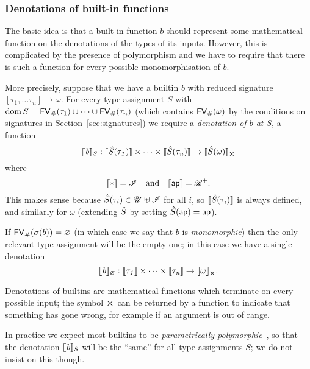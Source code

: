 \subsubsection{Denotations of built-in functions}
\label{sec:builtin-denotations}
The basic idea is that a built-in function $b$ should represent some
mathematical function on the denotations of the types of its inputs.  However,
this is complicated by the presence of polymorphism and we have to require that
there is such a function for every possible monomorphisation of $b$.

More precisely, suppose that we have a builtin $b$ with reduced signature
$[\tau_1, \ldots \tau_n] \rightarrow \omega$.  For every type assignment $S$ with
$\operatorname{dom} S = \mathsf{FV}_{\#}(\tau_1) \cup \cdots \cup \mathsf{FV}_{\#}(\tau_n)$ (which contains $\mathsf{FV}_{\#}(\omega)$ by
the conditions on signatures in Section~\ref{sec:signatures}) we require a
\textit{denotation of $b$ at $S$}, a function
$$
\denote{b}_S: \denote{\Sext(\tau_1)} \times \cdots \times \denote{\Sext(\tau_n)} \rightarrow \withError{\denote{\Sext(\omega)}}
$$%
\noindent where
$$
\denote{\star} = \Inputs \quad\text{and}\quad \denote{\ap} = \R^+.
$$
\noindent This makes sense because $\hat{S}(\tau_i) \in \mathscr{U} \uplus
\mathscr{I}$ for all $i$, so $\llbracket\mathit{\hat{S}(\tau_i)}\rrbracket$ is always defined,
and similarly for $\omega$ (extending $\hat{S}$ by setting $\hat{S}(\textsf{ap}) = \textsf{ap}$).

\medskip
\noindent If $\mathsf{FV}_{\#}(\bar{\sigma}(b)) = \varnothing$ (in which case we say that $b$ is
\textit{monomorphic}) then the only relevant type assignment will be the empty
one; in this case we have a single denotation
$$
\denote{b}_\varnothing: \denote{\tau_1} \times \cdots \times \denote{\tau_n} \rightarrow \withError{\denote{\omega}}.
$$

\smallskip
\noindent Denotations of builtins are mathematical functions which terminate on
every possible input; the symbol $\errorX$ can be returned by a function to
indicate that something has gone wrong, for example if an argument is out of
range.

\smallskip
\noindent In practice we expect most builtins to be \textit{parametrically
  polymorphic}~\cite{Wadler-theorems-for-free, Reynolds-parametric}, so that the
denotation $\llbracket\mathit{b}\rrbracket_S$ will be the ``same'' for all type assignments $S$; we do
not insist on this though.

